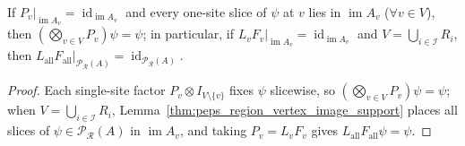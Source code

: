 \begin{lemma}%
    \label{thm:peps_range_parent_slice_reconstruction}
    \leanok
    If $P_v|_{\operatorname{im}A_v}=\operatorname{id}_{\operatorname{im}A_v}$ and every one-site slice of $\psi$ at $v$ lies in $\operatorname{im}A_v$ ($\forall v\in V$), then $(\bigotimes_{v\in V}P_v)\psi=\psi$; in particular, if $L_vF_v|_{\operatorname{im}A_v}=\operatorname{id}_{\operatorname{im}A_v}$ and $V=\bigcup_{i\in\mathcal I}R_i$, then $L_{\mathrm{all}}F_{\mathrm{all}}|_{\mathcal P_{\mathcal R}(A)}=\operatorname{id}_{\mathcal P_{\mathcal R}(A)}$.
\end{lemma}
\begin{proof}\leanok
    Each single-site factor $P_v\otimes I_{V\setminus\{v\}}$ fixes $\psi$ slicewise, so $(\bigotimes_{v\in V}P_v)\psi=\psi$; when $V=\bigcup_{i\in\mathcal I}R_i$, Lemma~\ref{thm:peps_region_vertex_image_support} places all slices of $\psi\in\mathcal P_{\mathcal R}(A)$ in $\operatorname{im}A_v$, and taking $P_v=L_vF_v$ gives $L_{\mathrm{all}}F_{\mathrm{all}}\psi=\psi$.
\end{proof}

